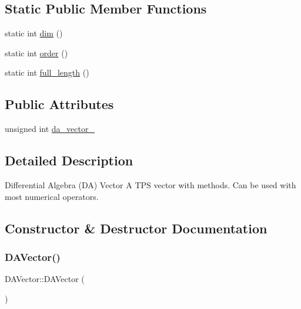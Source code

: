 \subsection*{Static Public Member Functions}
\begin{DoxyCompactItemize}
\item 
static int \mbox{\hyperlink{struct_d_a_vector_a1eeb99a92d75ddd495ba8d34ba7a665e}{dim}} ()
\item 
static int \mbox{\hyperlink{struct_d_a_vector_a442d4b491a94164eb52936143b332345}{order}} ()
\item 
static int \mbox{\hyperlink{struct_d_a_vector_a68677512679c5151a59e0e6a2306fdee}{full\+\_\+length}} ()
\end{DoxyCompactItemize}
\subsection*{Public Attributes}
\begin{DoxyCompactItemize}
\item 
unsigned int \mbox{\hyperlink{struct_d_a_vector_a359a2e0b8e48c6e481b48b5972e7631c}{da\+\_\+vector\+\_\+}}
\end{DoxyCompactItemize}


\subsection{Detailed Description}
Differential Algebra (DA) Vector A T\+PS vector with methods. Can be used with most numerical operators. 



\subsection{Constructor \& Destructor Documentation}
\mbox{\label{struct_d_a_vector_a47a3dafd63402c989e1a85ce9ef93039}} 
\subsubsection{\texorpdfstring{DAVector()}{DAVector()}\hspace{0.1cm}{\footnotesize\ttfamily [1/4]}}
{\footnotesize\ttfamily D\+A\+Vector\+::\+D\+A\+Vector (\begin{DoxyParamCaption}{ }\end{DoxyParamCaption})}

